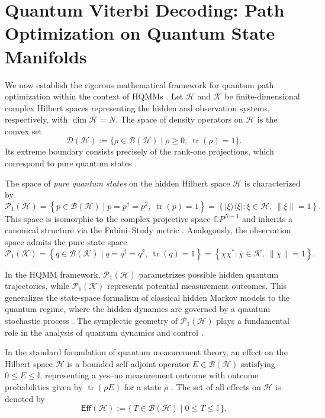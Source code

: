 \documentclass[12pt, reco]{article}
\begin{document}
\section{Quantum Viterbi Decoding: Path Optimization on Quantum State Manifolds}\label{Quantum_Vit_Alg}
We now establish the rigorous mathematical framework for quantum path optimization within the context of  HQMMs \cite{Monras11, AGLS24Q}. Let $\mathcal{H}$ and $\mathcal{K}$ be finite-dimensional complex Hilbert spaces representing the hidden and observation systems, respectively, with $\dim\mathcal{H} = N$. The space of density operators on $\mathcal{H}$ is the convex set
\[
\mathcal{D}(\mathcal{H}) := \{\rho \in \mathcal{B}(\mathcal{H}) \mid \rho \geq 0,\ \operatorname{tr}(\rho) = 1\}.
\]
Its extreme boundary consists precisely of the rank-one projections, which correspond to pure quantum states \cite{Neumann18, Nielsen2000}.

The space of \emph{pure quantum states} on the hidden Hilbert space $\mathcal{H}$ is characterized by
\[
\mathcal{P}_1(\mathcal{H}) = \left\{ p \in \mathcal{B}(\mathcal{H}) \mid p = p^\dagger = p^2,\ \operatorname{tr}(p) = 1 \right\} = \left\{ |\xi\rangle\langle\xi| : \xi \in \mathcal{H},\ \|\xi\| = 1 \right\}.
\]
This space is isomorphic to the complex projective space $\mathbb{C}P^{N-1}$ and inherits a canonical   structure via the Fubini--Study metric \cite{Nielsen2000}. Analogously, the observation space admits the pure state space
\[
\mathcal{P}_1(\mathcal{K}) = \left\{ q \in \mathcal{B}(\mathcal{K}) \mid q = q^\dagger = q^2,\ \operatorname{tr}(q) = 1 \right\} = \left\{ \chi\chi^* : \chi \in \mathcal{K},\ \|\chi\| = 1 \right\}.
\]

In the HQMM framework, $\mathcal{P}_1(\mathcal{H})$ parametrizes possible hidden quantum trajectories, while $\mathcal{P}_1(\mathcal{K})$ represents potential measurement outcomes. This generalizes the state-space formalism of classical hidden Markov models \cite{Rab2002, WhiteMahonyBrushe00} to the quantum regime, where the hidden dynamics are governed by a quantum stochastic process \cite{accardi1974, ASS20}. The symplectic geometry of $\mathcal{P}_1(\mathcal{H})$ plays a fundamental role in the analysis of quantum dynamics and control \cite{ticozzi2008, GT25}.

In the standard formulation of quantum measurement theory, an effect  on the Hilbert space \(\mathcal{H}\) is a bounded self-adjoint operator \(E \in \mathcal{B}(\mathcal{H})\) satisfying \(0 \leq E \leq \mathbb{I}\), representing a yes–no measurement outcome with outcome probabilities given by \(\operatorname{tr}(\rho E)\) for a state \(\rho\) \cite{MilP07}. The set of all effects on \(\mathcal{H}\) is denoted by
\begin{equation}\label{eq:effects}
\mathsf{Eff}(\mathcal{H}) := \{\, T \in \mathcal{B}(\mathcal{H}) \mid 0 \leq T \leq \mathbb{I} \,\}.
\end{equation}
\end{document}

